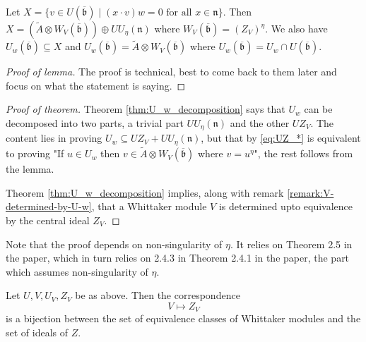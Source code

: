 \documentclass{article}
\theoremstyle{mytheoremstyle}
\theoremstyle{mytheoremstyle}
\theoremstyle{myproblemstyle}
\begin{document}
    \begin{lemma}
      Let $X = \{v \in U(\overline{\mathfrak b}) \mid (x \cdot v)w = 0 \text{ for all } x \in \mathfrak n\}$. Then 
      $X = (\tilde A \otimes W_V(\overline{\mathfrak b})) \oplus UU_\eta(\mathfrak n)$ where $W_V(\overline{\mathfrak b}) = (Z_V)^\eta$.
      We also have $U_w(\overline{\mathfrak b}) \subseteq X$ and $U_w(\overline{\mathfrak b}) = \tilde A \otimes W_V(\overline{\mathfrak b})$ 
      where $U_w(\overline{\mathfrak b}) = U_w \cap U(\overline{\mathfrak b})$.

    \end{lemma}

    \begin{proof}[Proof of lemma]
      The proof is technical, best to come back to them later and focus on what the statement is saying.
    \end{proof}

    \begin{proof}[Proof of theorem]
    	Theorem \ref{thm:U_w_decomposition} says that $U_w$ can be decomposed into two parts, a trivial 
	part $UU_\eta(\mathfrak n)$ and the other $UZ_V$. The content lies in proving 
	$U_w \subseteq UZ_V + UU_\eta(\mathfrak n)$, but that by \eqref{eq:UZ_*} is equivalent to proving 
	"If $u\in U_w$ then $v \in \tilde A \otimes W_V(\overline{\mathfrak b})$ where $v = u^\eta$", the rest 
	follows from the lemma.

	Theorem \ref{thm:U_w_decomposition} implies, along with remark \ref{remark:V-determined-by-U-w},
	  that a Whittaker module $V$ is determined upto equivalence 
	by the central ideal $Z_V$.
    \end{proof}

  \begin{remark}
    Note that the proof depends on non-singularity of $\eta$.
    It relies on Theorem 2.5 in the paper, which in turn relies on 2.4.3 in Theorem 2.4.1 in the paper,
    the part which assumes non-singularity of $\eta$. 
  \end{remark} 
    

    \begin{theorem}
      Let $U, V, U_V, Z_V$ be as above. Then the correspondence 
      \begin{equation}
      	V \mapsto Z_V
      	\label{eq:correspondence}
      \end{equation}
      is a bijection between the set of equivalence classes of Whittaker modules and the set of ideals of $Z$.
    \end{theorem}
    
\end{document}

